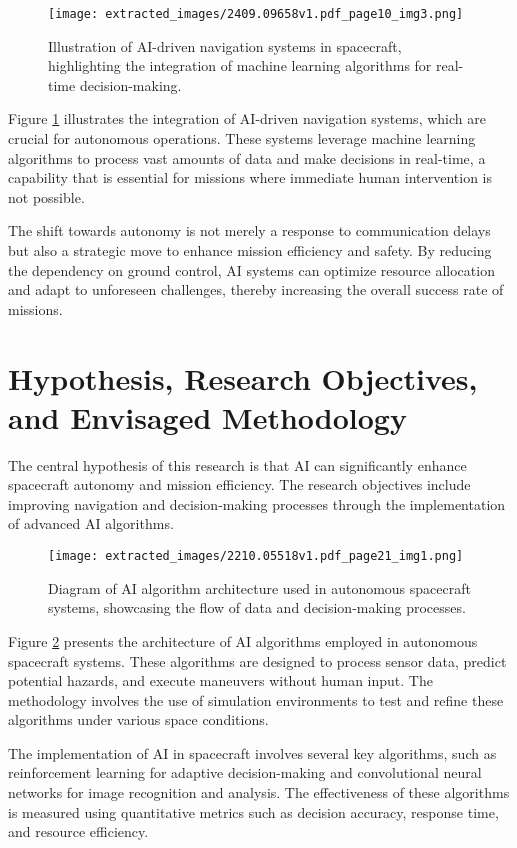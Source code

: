 \documentclass[12pt]{article}
\begin{document}
\begin{figure}[htbp]
    \centering
    \texttt{[image: extracted\_images/2409.09658v1.pdf\_page10\_img3.png]}
    \caption{Illustration of AI-driven navigation systems in spacecraft, highlighting the integration of machine learning algorithms for real-time decision-making.}
    \label{fig:ai_navigation}
\end{figure}

Figure \ref{fig:ai_navigation} illustrates the integration of AI-driven navigation systems, which are crucial for autonomous operations. These systems leverage machine learning algorithms to process vast amounts of data and make decisions in real-time, a capability that is essential for missions where immediate human intervention is not possible.

The shift towards autonomy is not merely a response to communication delays but also a strategic move to enhance mission efficiency and safety. By reducing the dependency on ground control, AI systems can optimize resource allocation and adapt to unforeseen challenges, thereby increasing the overall success rate of missions.

\section{Hypothesis, Research Objectives, and Envisaged Methodology}
The central hypothesis of this research is that AI can significantly enhance spacecraft autonomy and mission efficiency. The research objectives include improving navigation and decision-making processes through the implementation of advanced AI algorithms.

\begin{figure}[htbp]
    \centering
    \texttt{[image: extracted\_images/2210.05518v1.pdf\_page21\_img1.png]}
    \caption{Diagram of AI algorithm architecture used in autonomous spacecraft systems, showcasing the flow of data and decision-making processes.}
    \label{fig:ai_algorithm}
\end{figure}

Figure \ref{fig:ai_algorithm} presents the architecture of AI algorithms employed in autonomous spacecraft systems. These algorithms are designed to process sensor data, predict potential hazards, and execute maneuvers without human input. The methodology involves the use of simulation environments to test and refine these algorithms under various space conditions.

The implementation of AI in spacecraft involves several key algorithms, such as reinforcement learning for adaptive decision-making and convolutional neural networks for image recognition and analysis. The effectiveness of these algorithms is measured using quantitative metrics such as decision accuracy, response time, and resource efficiency.
\end{document}
